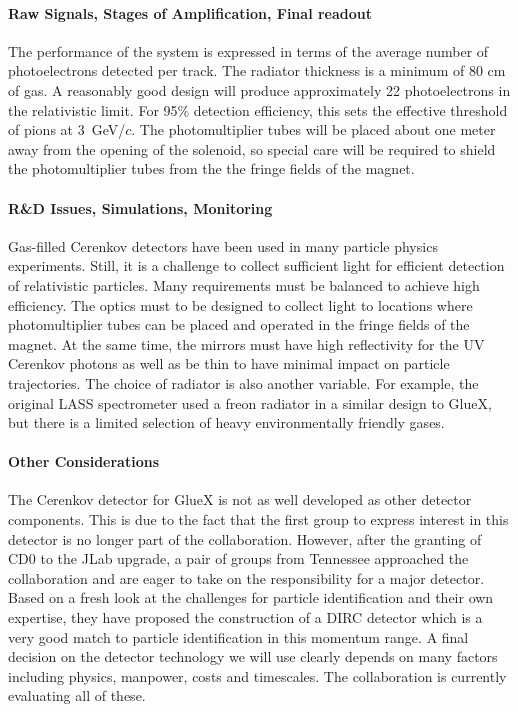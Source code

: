 \documentclass[11pt]{article}
\begin{document}
\paragraph{Raw Signals, Stages of Amplification, Final readout}

The performance of the system is expressed in terms of the average number
of photoelectrons detected per track. The radiator thickness is a minimum
of 80 cm of gas. A reasonably good design will produce
approximately 22 photoelectrons in the relativistic limit. For 95\%
detection efficiency, this sets the effective threshold of pions at  3~GeV/$c$.
The photomultiplier tubes will be placed about one meter away from the
opening of the solenoid, so special care will be required to
shield the photomultiplier tubes from the the fringe fields of the magnet.

\paragraph{R\&D Issues, Simulations, Monitoring}

Gas-filled Cerenkov detectors have been used in many particle physics 
experiments. Still, it is a challenge to collect
sufficient light for efficient detection of relativistic
particles. Many requirements must be balanced to achieve high efficiency.
The optics must to be designed to collect light to locations
where photomultiplier tubes can be placed and operated in the fringe
fields of the magnet. At the same time, the mirrors must have high reflectivity for the UV Cerenkov
photons as well as be thin to have minimal impact on particle trajectories.
The choice of radiator is also another variable. For example, the 
original LASS spectrometer used a freon radiator in a 
similar design to GlueX, but there is a limited selection of heavy
environmentally friendly gases. 

\paragraph{Other Considerations}

The Cerenkov detector for GlueX is not as well developed as other detector components.
This is due to the fact that the first group to express interest in this detector
is no longer part of the collaboration. However, after the granting of CD0 to the JLab 
upgrade, a pair of groups from Tennessee approached the collaboration and are eager to 
take on the responsibility for a major detector. Based on a fresh look at the challenges
for particle identification and their own expertise, they have proposed the
construction of a DIRC detector which is a very good match to particle identification
in this momentum range. A final decision on the detector technology we will use clearly
depends on many factors including physics, manpower, costs and timescales. The collaboration
is currently evaluating all of these.
\end{document}
